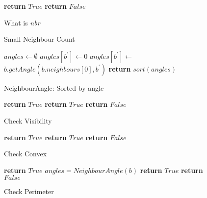 \documentclass{ieeeaccess}
\begin{document}
\clearpage
\begin{figure}
\begin{algorithmic}[1]
{}
   \State\textbf{return} $True$
\EndIf
\State\textbf{return} $False$
\EndProcedure
\end{algorithmic}
\caption{Small Neighbour Count}
\label{algo:SmallNeighbourCount}
What is \textit{nbr}
\end{figure}

\begin{figure}
\begin{algorithmic}[1]
{}
\State $angles \gets \emptyset$
  \State $angles[b^{'}] \gets 0$
\Else
   \State $angles[b^{'}] \gets $ \hfill
  \Statex \hfill $b.getAngle(b.neighbours[0], b^{'})$ 
\EndIf
\EndFor
\State\textbf{return} $sort(angles)$ 
\EndProcedure
\end{algorithmic}
\caption{NeighbourAngle: Sorted by angle}
\label{algo:getNeighbourAngles}

\end{figure}

\begin{figure}
\begin{algorithmic}[1]
{}
\State\textbf{return} $True$
   \EndIf
{}
\State\textbf{return} $True$
\EndIf
\EndFor
\State\textbf{return} $False$
\EndProcedure
\end{algorithmic}
\caption{Check Visibility}
\label{algo:CheckVisibility}
\end{figure}

\begin{figure}
\begin{algorithmic}[1]
{}
\State\textbf{return} $True$
\EndIf
\EndIf
{}
\State\textbf{return} $True$
\EndIf
\EndFor
\State\textbf{return} $False$
\EndProcedure
\end{algorithmic}
\caption{Check Convex}
\label{algo:CheckConvex}
\end{figure}

\begin{figure}
\begin{algorithmic}[1]
{}
\State\textbf{return} $True$
\EndIf
\State$angles = NeighbourAngle(b)$
\State\textbf{return} $True$
\EndIf
\EndIf
\State\textbf{return} $False$
\EndProcedure
\end{algorithmic}
\caption{Check Perimeter}
\label{algo:CheckPerimeter}
\end{figure}
\end{document}
